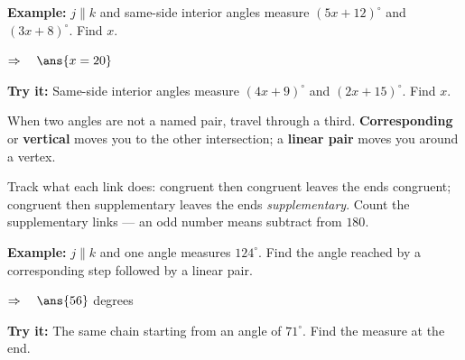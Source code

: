 \documentclass[12pt]{article}
\begin{document}
\begin{examplebox}
\textbf{Example:} \quad $j \parallel k$ and same-side interior angles measure $(5x + 12)^\circ$ and $(3x + 8)^\circ$. Find $x$.

$\Rightarrow\quad \ans{x = 20}$
\end{examplebox}

\begin{tryitbox}
\textbf{Try it:} \quad Same-side interior angles measure $(4x + 9)^\circ$ and $(2x + 15)^\circ$. Find $x$.\\[2pt]
\end{tryitbox}


\begin{formulabox}
When two angles are not a named pair, travel through a third. \textbf{Corresponding} or \textbf{vertical} moves you to the other intersection; a \textbf{linear pair} moves you around a vertex.\par
Track what each link does: congruent then congruent leaves the ends congruent; congruent then supplementary leaves the ends \emph{supplementary}. Count the supplementary links --- an odd number means subtract from $180$.
\end{formulabox}

\begin{examplebox}
\textbf{Example:} \quad $j \parallel k$ and one angle measures $124^\circ$. Find the angle reached by a corresponding step followed by a linear pair.

$\Rightarrow\quad \ans{56}$ degrees
\end{examplebox}

\begin{tryitbox}
\textbf{Try it:} \quad The same chain starting from an angle of $71^\circ$. Find the measure at the end.\\[2pt]
\end{tryitbox}
\end{document}
